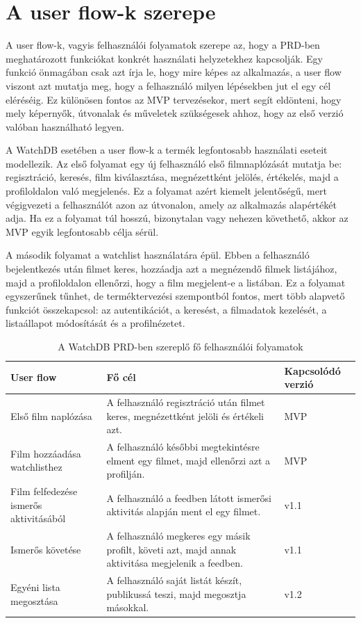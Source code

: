 \section{A user flow-k szerepe}

A user flow-k, vagyis felhasználói folyamatok szerepe az, hogy a PRD-ben meghatározott funkciókat konkrét használati helyzetekhez kapcsolják. Egy funkció önmagában csak azt írja le, hogy mire képes az alkalmazás, a user flow viszont azt mutatja meg, hogy a felhasználó milyen lépésekben jut el egy cél eléréséig. Ez különösen fontos az MVP tervezésekor, mert segít eldönteni, hogy mely képernyők, útvonalak és műveletek szükségesek ahhoz, hogy az első verzió valóban használható legyen.

A WatchDB esetében a user flow-k a termék legfontosabb használati eseteit modellezik. Az első folyamat egy új felhasználó első filmnaplózását mutatja be: regisztráció, keresés, film kiválasztása, megnézettként jelölés, értékelés, majd a profiloldalon való megjelenés. Ez a folyamat azért kiemelt jelentőségű, mert végigvezeti a felhasználót azon az útvonalon, amely az alkalmazás alapértékét adja. Ha ez a folyamat túl hosszú, bizonytalan vagy nehezen követhető, akkor az MVP egyik legfontosabb célja sérül.

A második folyamat a watchlist használatára épül. Ebben a felhasználó bejelentkezés után filmet keres, hozzáadja azt a megnézendő filmek listájához, majd a profiloldalon ellenőrzi, hogy a film megjelent-e a listában. Ez a folyamat egyszerűnek tűnhet, de terméktervezési szempontból fontos, mert több alapvető funkciót összekapcsol: az autentikációt, a keresést, a filmadatok kezelését, a listaállapot módosítását és a profilnézetet.

\begin{table}[H]
\centering
\renewcommand{\arraystretch}{1.25}
\begin{tabular}{|p{}|p{}|p{}|}
\hline
\textbf{User flow} & \textbf{Fő cél} & \textbf{Kapcsolódó verzió} \\
\hline
Első film naplózása & A felhasználó regisztráció után filmet keres, megnézettként jelöli és értékeli azt. & MVP \\
\hline
Film hozzáadása watchlisthez & A felhasználó későbbi megtekintésre elment egy filmet, majd ellenőrzi azt a profilján. & MVP \\
\hline
Film felfedezése ismerős aktivitásából & A felhasználó a feedben látott ismerősi aktivitás alapján ment el egy filmet. & v1.1 \\
\hline
Ismerős követése & A felhasználó megkeres egy másik profilt, követi azt, majd annak aktivitása megjelenik a feedben. & v1.1 \\
\hline
Egyéni lista megosztása & A felhasználó saját listát készít, publikussá teszi, majd megosztja másokkal. & v1.2 \\
\hline
\end{tabular}
\caption{A WatchDB PRD-ben szereplő fő felhasználói folyamatok}
\label{tab:watchdb-user-flows}
\end{table}

